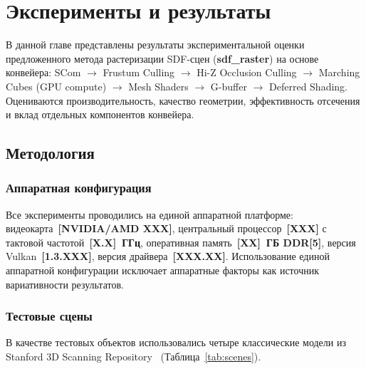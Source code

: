 
\chapter{Эксперименты и результаты}
\label{chap:experiments}

В данной главе представлены результаты экспериментальной оценки предложенного
метода растеризации SDF-сцен (\textbf{sdf\_raster}) на основе конвейера:
SCom $\to$ Frustum Culling $\to$ Hi-Z Occlusion Culling $\to$ Marching Cubes
(GPU compute) $\to$ Mesh Shaders $\to$ G-buffer $\to$ Deferred Shading.
Оцениваются производительность, качество геометрии, эффективность отсечения
и вклад отдельных компонентов конвейера.

\section{Методология}
\label{sec:methodology}

\subsection{Аппаратная конфигурация}

Все эксперименты проводились на единой аппаратной платформе:
видеокарта~\textbf{[NVIDIA/AMD XXX]}, центральный процессор~\textbf{[XXX]}
с тактовой частотой~\textbf{[X.X]~ГГц}, оперативная память~\textbf{[XX]~ГБ
DDR[5]}, версия Vulkan~\textbf{[1.3.XXX]}, версия драйвера~\textbf{[XXX.XX]}.
Использование единой аппаратной конфигурации исключает аппаратные факторы
как источник вариативности результатов.

\subsection{Тестовые сцены}

В качестве тестовых объектов использовались четыре классические модели
из Stanford 3D Scanning Repository~\cite{stanford_models}
(Таблица~\ref{tab:scenes}).

